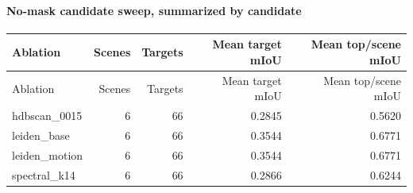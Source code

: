 \documentclass[10pt]{article}
\begin{document}
\paragraph{No-mask candidate sweep, summarized by candidate}
\small
\begin{longtable}{lrrrr}
\toprule
Ablation & Scenes & Targets & Mean target mIoU & Mean top/scene mIoU \\
\midrule
\endfirsthead
\toprule
Ablation & Scenes & Targets & Mean target mIoU & Mean top/scene mIoU \\
\midrule
\endhead
hdbscan\_0015 & 6 & 66 & 0.2845 & 0.5620 \\
leiden\_base & 6 & 66 & 0.3544 & 0.6771 \\
leiden\_motion & 6 & 66 & 0.3544 & 0.6771 \\
spectral\_k14 & 6 & 66 & 0.2866 & 0.6244 \\
\bottomrule
\end{longtable}
\normalsize
\end{document}
